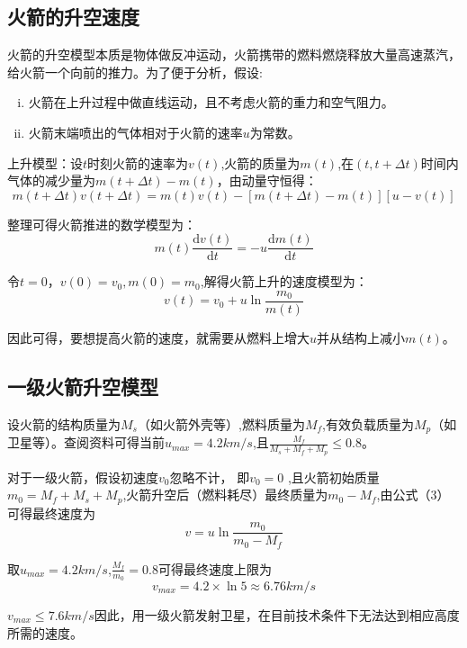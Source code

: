 \documentclass[UTF8]{ctexart}
\begin{document}
        \subsection{火箭的升空速度}
        火箭的升空模型本质是物体做反冲运动，火箭携带的燃料燃烧释放大量高速蒸汽，给火箭一个向前的推力。为了便于分析，假设:
        \begin{enumerate}[(i)]
            \item 火箭在上升过程中做直线运动，且不考虑火箭的重力和空气阻力。
            \item 火箭末端喷出的气体相对于火箭的速率$u$为常数。
        \end{enumerate}
        \par 上升模型：设$t$时刻火箭的速率为$v(t)$,火箭的质量为$m(t)$,在$(t,t+\varDelta t)$时间内气体的减少量为$m(t+\varDelta t)-m(t)$，由动量守恒得：
        \begin{equation}
            m(t+\Delta t)v(t+\Delta t) =m(t)v(t)-\left [ m(t+\Delta t)-m(t) \right ]\left [  u-v(t)\right ]
        \end{equation}
        \par 整理可得火箭推进的数学模型为：
        \begin{equation}
            m(t)\frac{\mathrm{d} v(t)}{\mathrm{d} t}=-u\frac{\mathrm{d} m(t)}{\mathrm{d} t}  
        \end{equation}
        \par 令$t=0$，$v(0)=v_0,m(0)=m_0$,解得火箭上升的速度模型为：
        \begin{equation}
            v(t)=v_0+u\ln\frac{m_0}{m(t)} 
        \end{equation}
        \par 因此可得，要想提高火箭的速度，就需要从燃料上增大$u$并从结构上减小$m(t)$。
        
        
        \subsection{一级火箭升空模型}
        \par 设火箭的结构质量为$M_s$（如火箭外壳等）,燃料质量为$M_f$,有效负载质量为$M_p$（如卫星等）。查阅资料可得当前$u_{max}=4.2km/s$,且$\frac{M_f}{M_s+M_f+M_p} \le 0.8$。
        \par 对于一级火箭，假设初速度$v_0$忽略不计，
             即$v_0 = 0$ ,且火箭初始质量$m_0=M_f+M_s+M_p$,火箭升空后（燃料耗尽）最终质量为$m_0-M_f$,由公式（3）可得最终速度为
             \begin{equation}
                v=u\ln\frac{m_0}{m_0-M_f}
             \end{equation}
        \par 取$u_{max}=4.2km/s$,$\frac{M_f}{m_0} = 0.8$可得最终速度上限为
        \begin{equation*}
            v_{max}=4.2\times \ln5 \approx 6.76km/s
        \end{equation*}
        \par $v_{max} \le 7.6km/s$因此，用一级火箭发射卫星，在目前技术条件下无法达到相应高度所需的速度。
\end{document}
